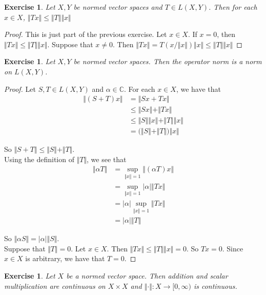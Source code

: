 \documentclass[12pt]{amsart}
\newtheorem{ex}[thm]{Exercise}
\newcommand{\al}{\alpha}
\newcommand{\C}{\mathbb{C}}
\newcommand{\Rg}{[0,\infty)}
\newcommand{\n}{\Vert}
\begin{document}
\begin{ex}
Let $X,Y$ be normed vector spaces and $T \in L(X,Y)$. Then for each $x \in X$, $\n Tx \n  \leq \n T\n \n x \n$
\end{ex}

\begin{proof}
This is just part of the previous exercise. Let $x \in X$. If $x = 0$, then $\n Tx \n \leq \n T \n \n x \n $. Suppose that $x \neq 0$. Then $\n Tx \n = T(x/\n x\n )\n x\n \leq \n T \n \n x \n$
\end{proof}

\begin{ex}
Let $X, Y$ be normed vector spaces. Then the operator norm is a norm on $L(X,Y)$.
\end{ex}

\begin{proof}
Let $S,T \in L(X,Y)$ and $\al \in \C$. For each $x \in X$, we have that 
\begin{align*}
\n (S+T)x \n
&= \n Sx+Tx \n \\
& \leq \n Sx \n + \n Tx \n \\
&\leq \n S \n \n x \n + \n T \n \n x \n \\
&= \big(\n S \n + \n T \n \big) \n x \n
\end{align*}

So $\n S+T \n \leq \n S \n + \n T \n$.\vspace{1cm}\\

Using the definition of $\n T \n$, we see that 
\begin{align*}
\n \al T \n 
&= \sup_{\n x \n =1} \n (\al T)x \n \\
&= \sup_{\n x \n =1} \vert \al \vert \n Tx \n\\
&=\vert \al \vert \sup_{\n x \n =1} \n Tx \n \\
&=\vert \al \vert \n T \n
\end{align*} 

So $\n \al S \n = \vert \al \vert \n S \n $. \vspace{1cm}\\ Suppose that $\n T \n = 0$. Let $x \in X$. Then $\n T x\n \leq \n T \n \n x \n = 0$. So $Tx=0$. Since $x \in X$ is arbitrary, we have that $T=0$. 
\end{proof}

\begin{ex}
Let $X$ be a normed vector space. Then addition and scalar multiplication are continuous on $X \times X$ and $\n \cdot \n:X \rightarrow \Rg$ is continuous.
\end{ex}
\end{document}
